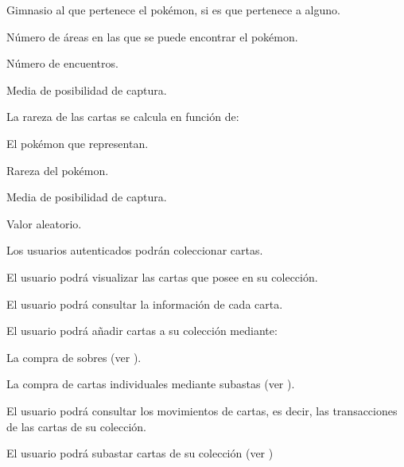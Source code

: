 \begin{RFColeccionCartas}
\begin{RFColeccionCartas}
\begin{RFColeccionCartas}
			\item Gimnasio al que pertenece el pokémon, si es que pertenece a alguno.
			\item Número de áreas en las que se puede encontrar el pokémon.
			\item Número de encuentros.
			\item Media de posibilidad de captura.
		\end{RFColeccionCartas}
		\item La rareza de las cartas se calcula en función de:
		\begin{RFColeccionCartas}
			\item El pokémon que representan.
			\item Rareza del pokémon.
			\item Media de posibilidad de captura.
			\item Valor aleatorio.
		\end{RFColeccionCartas}
	\end{RFColeccionCartas}
	\item Los usuarios autenticados podrán coleccionar cartas.\label{req_coleccion_cartas} \hypertarget{req_coleccion_cartas}{}
	\begin{RFColeccionCartas}
		\item El usuario podrá visualizar las cartas que posee en su colección.
		\item El usuario podrá consultar la información de cada carta.
		\item El usuario podrá añadir cartas a su colección mediante:
		\begin{RFColeccionCartas}
			\item La compra de sobres (ver ).
			\item La compra de cartas individuales mediante subastas (ver ).
		\end{RFColeccionCartas}
		\item El usuario podrá consultar los movimientos de cartas, es decir, las transacciones de las cartas de su colección.
		\item El usuario podrá subastar cartas de su colección (ver )
	\end{RFColeccionCartas}
\end{RFColeccionCartas}